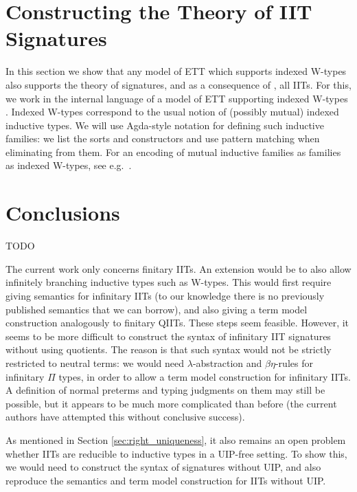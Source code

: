 \documentclass[a4paper,UKenglish,cleveref, autoref]{lipics-v2019}
\begin{document}

\section{Constructing the Theory of IIT Signatures}
\label{sec:ambroise}

In this section we show that any model of ETT which supports indexed
W-types also supports the theory of signatures, and as a consequence
of , all IITs. For this, we work in the internal
language of a model of ETT supporting indexed W-types
\cite{indexedcont}. Indexed W-types correspond to the usual notion of
(possibly mutual) indexed inductive types. We will use Agda-style
notation for defining such inductive families: we list the sorts and
constructors and use pattern matching when eliminating from them. For
an encoding of mutual inductive families as families as indexed
W-types, see e.g.\ \cite{mutual}.




\section{Conclusions}
\label{sec:conclusions}

TODO

The current work only concerns finitary IITs. An extension would be to also
allow infinitely branching inductive types such as W-types. This would first
require giving semantics for infinitary IITs (to our knowledge there is no
previously published semantics that we can borrow), and also giving a term model
construction analogously to finitary QIITs. These steps seem feasible. However,
it seems to be more difficult to construct the syntax of infinitary IIT
signatures without using quotients. The reason is that such syntax would not be
strictly restricted to neutral terms: we would need $\lambda$-abstraction and
$\beta\eta$-rules for infinitary $\Pi$ types, in order to allow a term model
construction for infinitary IITs. A definition of normal preterms and typing
judgments on them may still be possible, but it appears to be much more
complicated than before (the current authors have attempted this without
conclusive success).

As mentioned in Section \ref{sec:right_uniqueness}, it also remains an open
problem whether IITs are reducible to inductive types in a UIP-free setting. To
show this, we would need to construct the syntax of signatures without UIP, and
also reproduce the semantics and term model construction for IITs without UIP.





\newpage

\appendix
\end{document}
